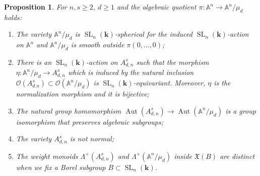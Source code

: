 \documentclass[11pt]{article}
\numberwithin{equation}{section}
\let\mathcal\mathscr
\theoremstyle{plain}
\newtheorem{proposition}[theorem]{Proposition}
\theoremstyle{definition}
\DeclareMathOperator{\SL}{SL}
\DeclareMathOperator{\Aut}{Aut}
\newcommand{\OO}{\mathcal{O}}
\renewcommand{\AA}{\mathbb{A}}
\newcommand{\kk}{{\boldsymbol{k}}}
\begin{document}
\begin{proposition}
\label{prop.ex_normality}
For $n, s \geq 2$, $d \geq 1$ and the algebraic quotient $\pi \colon \AA^n \to \AA^n / \mu_d$ holds:
\begin{enumerate}
\item \label{prop.ex_normality1}
The variety
$\mathbb{A}^n/\mu_d$ is $\SL_n(\kk)$-spherical for the induced $\SL_n(\kk)$-action
on $\AA^n$ and $\AA^n / \mu_d$ is smooth outside $\pi(0, \ldots, 0)$;
\item \label{prop.ex_normality2}
There is an $\SL_n(\kk)$-action on $A_{d, n}^s$ such that the morphism $\eta \colon \mathbb{A}^n/\mu_d \to A_{d, n}^s$ which is induced by the natural
inclusion $\OO(A_{d. n}^s) \subset \OO(\mathbb{A}^n/\mu_d)$ is
$\SL_n(\kk)$-equivariant. Moreover, $\eta$ is the normalization morphism and it is bijective;
\item \label{prop.ex_normality3}
The natural group homomorphism $\Aut(A_{d, n}^s) \to \Aut(\mathbb{A}^n/\mu_d)$
is a group isomorphism that preserves algebraic subgroups;
\item \label{prop.ex_normality4}
The variety $A_{d, n}^s$ is not normal;
\item \label{prop.ex_normality5}
The weight monoids $\Lambda^+(A_{d, n}^s)$ and $\Lambda^+(\mathbb{A}^n/\mu_d)$ inside $\mathfrak{X}(B)$ are distinct when we fix
a Borel subgroup $B \subset \SL_n(\kk)$.
\end{enumerate}
\end{proposition}
\end{document}
